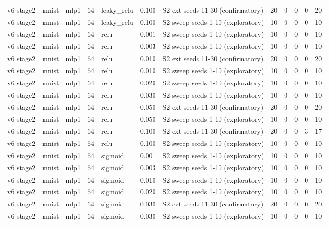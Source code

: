 \begin{table}[htbp]
{\begin{tabular}{@{}lllrlrlrrrrr@{}}
v6 stage2 & mnist & mlp1 & 64 & leaky\_relu & 0.100 & S2 ext seeds 11-30 (confirmatory) & 20 & 0 & 0 & 0 & 20 \\
v6 stage2 & mnist & mlp1 & 64 & leaky\_relu & 0.100 & S2 sweep seeds 1-10 (exploratory) & 10 & 0 & 0 & 0 & 10 \\
v6 stage2 & mnist & mlp1 & 64 & relu & 0.001 & S2 sweep seeds 1-10 (exploratory) & 10 & 0 & 0 & 0 & 10 \\
v6 stage2 & mnist & mlp1 & 64 & relu & 0.003 & S2 sweep seeds 1-10 (exploratory) & 10 & 0 & 0 & 0 & 10 \\
v6 stage2 & mnist & mlp1 & 64 & relu & 0.010 & S2 ext seeds 11-30 (confirmatory) & 20 & 0 & 0 & 0 & 20 \\
v6 stage2 & mnist & mlp1 & 64 & relu & 0.010 & S2 sweep seeds 1-10 (exploratory) & 10 & 0 & 0 & 0 & 10 \\
v6 stage2 & mnist & mlp1 & 64 & relu & 0.020 & S2 sweep seeds 1-10 (exploratory) & 10 & 0 & 0 & 0 & 10 \\
v6 stage2 & mnist & mlp1 & 64 & relu & 0.030 & S2 sweep seeds 1-10 (exploratory) & 10 & 0 & 0 & 0 & 10 \\
v6 stage2 & mnist & mlp1 & 64 & relu & 0.050 & S2 ext seeds 11-30 (confirmatory) & 20 & 0 & 0 & 0 & 20 \\
v6 stage2 & mnist & mlp1 & 64 & relu & 0.050 & S2 sweep seeds 1-10 (exploratory) & 10 & 0 & 0 & 0 & 10 \\
v6 stage2 & mnist & mlp1 & 64 & relu & 0.100 & S2 ext seeds 11-30 (confirmatory) & 20 & 0 & 0 & 3 & 17 \\
v6 stage2 & mnist & mlp1 & 64 & relu & 0.100 & S2 sweep seeds 1-10 (exploratory) & 10 & 0 & 0 & 0 & 10 \\
v6 stage2 & mnist & mlp1 & 64 & sigmoid & 0.001 & S2 sweep seeds 1-10 (exploratory) & 10 & 0 & 0 & 0 & 10 \\
v6 stage2 & mnist & mlp1 & 64 & sigmoid & 0.003 & S2 sweep seeds 1-10 (exploratory) & 10 & 0 & 0 & 0 & 10 \\
v6 stage2 & mnist & mlp1 & 64 & sigmoid & 0.010 & S2 sweep seeds 1-10 (exploratory) & 10 & 0 & 0 & 0 & 10 \\
v6 stage2 & mnist & mlp1 & 64 & sigmoid & 0.020 & S2 sweep seeds 1-10 (exploratory) & 10 & 0 & 0 & 0 & 10 \\
v6 stage2 & mnist & mlp1 & 64 & sigmoid & 0.030 & S2 ext seeds 11-30 (confirmatory) & 20 & 0 & 0 & 0 & 20 \\
v6 stage2 & mnist & mlp1 & 64 & sigmoid & 0.030 & S2 sweep seeds 1-10 (exploratory) & 10 & 0 & 0 & 0 & 10 \\

\end{tabular}}
\end{table}
